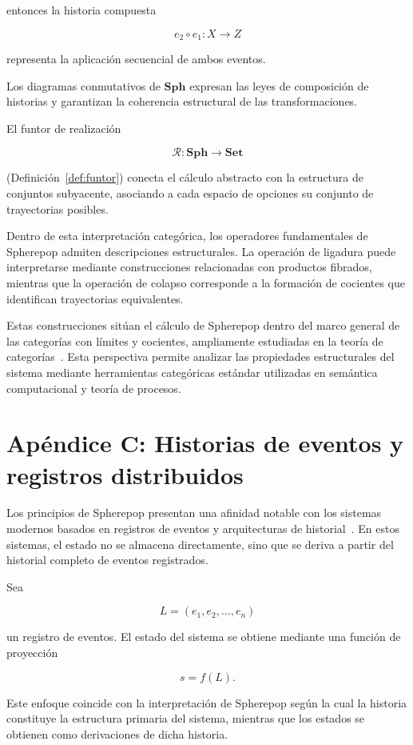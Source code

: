 \documentclass[12pt]{article}
\theoremstyle{plain}
\theoremstyle{definition}
\begin{document}
entonces la historia compuesta

\[
e_2 \circ e_1 : X \rightarrow Z
\]

representa la aplicación secuencial de ambos eventos.

Los diagramas conmutativos de $\mathbf{Sph}$ expresan las leyes de composición de historias y garantizan la coherencia estructural de las transformaciones.

El funtor de realización

\[
\mathcal{R} : \mathbf{Sph} \rightarrow \mathbf{Set}
\]

(Definición~\ref{def:funtor}) conecta el cálculo abstracto con la estructura de conjuntos subyacente, asociando a cada espacio de opciones su conjunto de trayectorias posibles.

Dentro de esta interpretación categórica, los operadores fundamentales de Spherepop admiten descripciones estructurales. La operación de ligadura puede interpretarse mediante construcciones relacionadas con productos fibrados, mientras que la operación de colapso corresponde a la formación de cocientes que identifican trayectorias equivalentes.

Estas construcciones sitúan el cálculo de Spherepop dentro del marco general de las categorías con límites y cocientes, ampliamente estudiadas en la teoría de categorías~\cite{maclane,awodey}. Esta perspectiva permite analizar las propiedades estructurales del sistema mediante herramientas categóricas estándar utilizadas en semántica computacional y teoría de procesos.

\section{Apéndice C: Historias de eventos y registros distribuidos}
\label{ap:distribuidos}

Los principios de Spherepop presentan una afinidad notable con los sistemas modernos basados en registros de eventos y arquitecturas de historial~\cite{fowler,kleppmann}. En estos sistemas, el estado no se almacena directamente, sino que se deriva a partir del historial completo de eventos registrados.

Sea

\[
L = (e_1, e_2, \ldots, e_n)
\]

un registro de eventos. El estado del sistema se obtiene mediante una función de proyección

\[
s = f(L).
\]

Este enfoque coincide con la interpretación de Spherepop según la cual la historia constituye la estructura primaria del sistema, mientras que los estados se obtienen como derivaciones de dicha historia.
\end{document}
